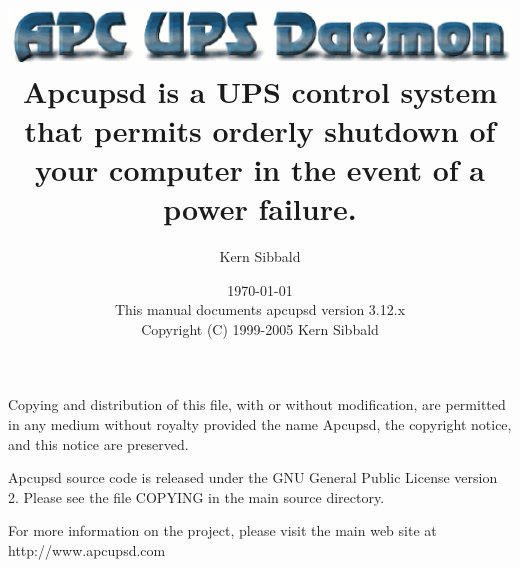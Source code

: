 \documentclass[11pt,a4paper]{report}
\begin{document}
\sloppy

\parskip 10pt
\parindent 0pt

\title{\includegraphics{./apcupsd.eps} \\ \bigskip
   \Large{Apcupsd is a UPS control system that permits
   orderly shutdown of your
   computer in the event of a power failure.} }
\author{Kern Sibbald}
\date{\vspace{2.0in}\today \\
      This manual documents apcupsd version 3.12.x \\
Copyright (C) 1999-2005 Kern Sibbald }


\maketitle

Copying and distribution of this file, with or without
modification, are permitted in any medium without royalty
provided the name Apcupsd, the copyright notice, and this notice
are preserved.

Apcupsd source code is released under the GNU General Public
License version 2. Please see the file COPYING in the main source
directory.

For more information on the project, please visit the main web
site at http://www.apcupsd.com

\clearpage
\tableofcontents
\clearpage
\listoffigures
\clearpage
\listoftables
\clearpage


\printindex
\end{document}
